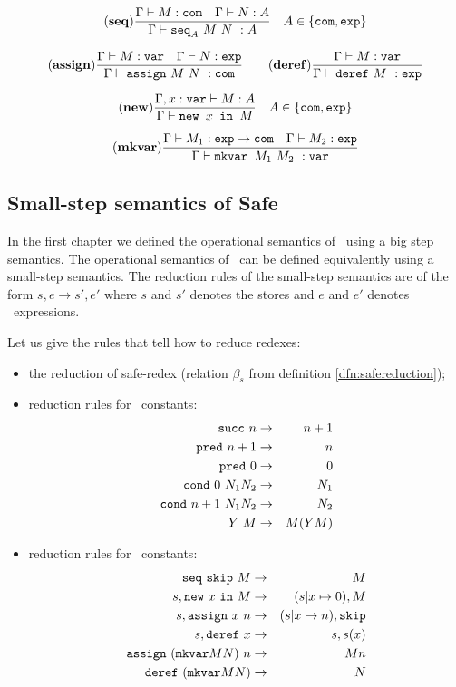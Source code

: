 $$ \mathbf{(seq)} \frac{\displaystyle \Gamma \vdash M : \texttt{com} \quad \Gamma \vdash N :A}{\Gamma \vdash \texttt{seq}_A \ M\ N\ : A} \quad A \in \{ \texttt{com}, \texttt{exp}\}$$

$$ \mathbf{(assign)} \frac{\displaystyle \Gamma \vdash M : \texttt{var} \quad \Gamma \vdash N : \texttt{exp}}{\Gamma \vdash \texttt{assign}\ M\ N\ : \texttt{com}}
\qquad
 \mathbf{(deref)} \frac{\displaystyle \Gamma \vdash M : \texttt{var}}{\Gamma \vdash \texttt{deref}\ M\ : \texttt{exp}}$$

$$ \mathbf{(new)} \frac{\displaystyle \Gamma, x : \texttt{var} \vdash M : A}{\Gamma \vdash \texttt{new } x \texttt{ in } M} \quad A \in \{ \texttt{com}, \texttt{exp}\}$$

$$ \mathbf{(mkvar)} \frac{\displaystyle \Gamma \vdash M_1 : \texttt{exp} \rightarrow \texttt{com} \quad \Gamma \vdash M_2 : \texttt{exp}}{\Gamma \vdash \texttt{mkvar } M_1\ M_2\ : \texttt{var}}$$

\subsection{Small-step semantics of Safe \ialgol}
In the first chapter we defined the operational semantics of
\ialgol\ using a big step semantics. The operational semantics of
\ialgol\ can be defined equivalently using a small-step semantics.
The reduction rules of the small-step semantics are of the form $s,e
\rightarrow s',e'$ where $s$ and $s'$ denotes the stores and $e$ and
$e'$ denotes \ialgol\ expressions.

Let us give the rules that tell how to reduce redexes:
\begin{itemize}
\item the reduction of safe-redex (relation $\beta_s$ from definition \ref{dfn:safereduction});
\item reduction rules for \pcf\ constants:
\begin{eqnarray*}
\texttt{succ}\ n &\rightarrow& n+1 \\
\texttt{pred}\ n+1 &\rightarrow& n \\
\texttt{pred}\ 0 &\rightarrow& 0 \\
\texttt{cond}\ 0\ N_1 N_2 &\rightarrow& N_1 \\
\texttt{cond}\ n+1\ N_1 N_2 &\rightarrow& N_2 \\
Y\ M &\rightarrow& M (Y M)
\end{eqnarray*}
\item reduction rules for \ialgol\ constants:
\begin{eqnarray*}
\texttt{seq}\ \texttt{skip}\  M &\rightarrow& M \\
s, \texttt{new}\ x\ \texttt{in}\ M &\rightarrow& (s|x\mapsto 0), M \\
s, \texttt{assign}\ x\ n &\rightarrow& (s|x\mapsto n), \texttt{skip} \\
s, \texttt{deref}\ x &\rightarrow& s, s(x) \\
\texttt{assign}\ (\texttt{mkvar} M N)\ n &\rightarrow& M n \\
\texttt{deref}\ (\texttt{mkvar} M N) &\rightarrow& N
\end{eqnarray*}
\end{itemize}

